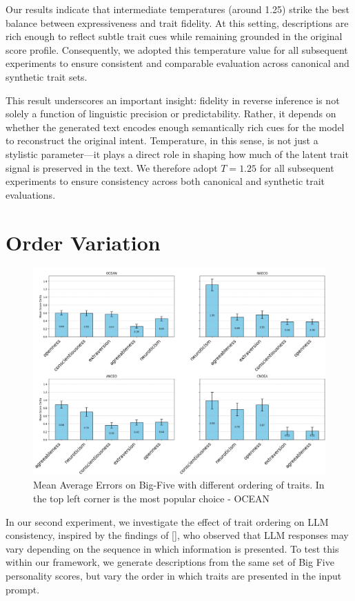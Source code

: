 \documentclass[12pt]{article}
\begin{document}
Our results indicate that intermediate temperatures (around 1.25) strike the best balance between expressiveness and trait fidelity. At this setting, descriptions are rich enough to reflect subtle trait cues while remaining grounded in the original score profile. Consequently, we adopted this temperature value for all subsequent experiments to ensure consistent and comparable evaluation across canonical and synthetic trait sets.

This result underscores an important insight: fidelity in reverse inference is not solely a function of linguistic precision or predictability. Rather, it depends on whether the generated text encodes enough semantically rich cues for the model to reconstruct the original intent. Temperature, in this sense, is not just a stylistic parameter—it plays a direct role in shaping how much of the latent trait signal is preserved in the text. We therefore adopt $T=1.25$ for all subsequent experiments to ensure consistency across both canonical and synthetic trait evaluations.

\section{Order Variation}
\begin{figure}[h]
    \centering
    \includegraphics[width=0.9\linewidth]{order_exp.png}
    \caption{Mean Average Errors on Big-Five with different ordering of traits. In the top left corner is the most popular choice - OCEAN}
    \label{fig:enter-label}
\end{figure}
In our second experiment, we investigate the effect of trait ordering on LLM consistency, inspired by the findings of [\cite{gupta2023self}], who observed that LLM responses may vary depending on the sequence in which information is presented. To test this within our framework, we generate descriptions from the same set of Big Five personality scores, but vary the order in which traits are presented in the input prompt.
\end{document}
